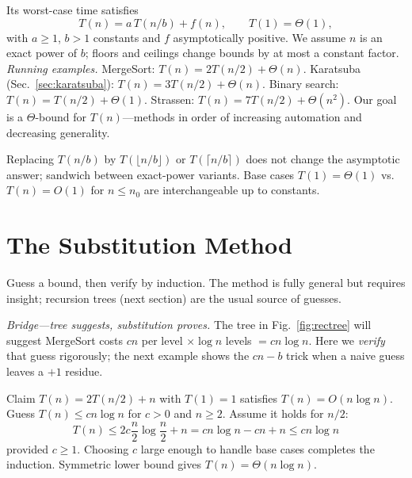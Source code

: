 Its worst-case time satisfies
\begin{equation}\label{eq:general}
T(n)=a\,T(n/b)+f(n),\qquad T(1)=\Theta(1),
\end{equation}
with $a\ge 1$, $b>1$ constants and $f$ asymptotically positive. We assume $n$ is an exact power of $b$; floors and ceilings change bounds by at most a constant factor.
\textit{Running examples.} MergeSort: $T(n)=2T(n/2)+\Theta(n)$. Karatsuba (Sec.~\ref{sec:karatsuba}): $T(n)=3T(n/2)+\Theta(n)$. Binary search: $T(n)=T(n/2)+\Theta(1)$. Strassen: $T(n)=7T(n/2)+\Theta(n^{2})$.
Our goal is a $\Theta$-bound for $T(n)$---methods in order of increasing automation and decreasing generality.
\begin{remark}
Replacing $T(n/b)$ by $T(\lfloor n/b\rfloor)$ or $T(\lceil n/b\rceil)$ does not change the asymptotic answer; sandwich between exact-power variants. Base cases $T(1)=\Theta(1)$ vs.\ $T(n)=O(1)$ for $n\le n_{0}$ are interchangeable up to constants.
\end{remark}

\section{The Substitution Method}

Guess a bound, then verify by induction. The method is fully general but requires insight; recursion trees (next section) are the usual source of guesses.

\smallskip\noindent\textit{Bridge---tree suggests, substitution proves.} The tree in Fig.~\ref{fig:rectree} will suggest MergeSort costs $cn$ per level $\times\log n$ levels $=cn\log n$. Here we \emph{verify} that guess rigorously; the next example shows the $cn-b$ trick when a naive guess leaves a $+1$ residue.

\begin{example}
Claim $T(n)=2T(n/2)+n$ with $T(1)=1$ satisfies $T(n)=O(n\log n)$. Guess $T(n)\le cn\log n$ for $c>0$ and $n\ge 2$. Assume it holds for $n/2$:
\[T(n)\le 2c\frac{n}{2}\log\frac{n}{2}+n = cn\log n-cn+n\le cn\log n\]
provided $c\ge 1$. Choosing $c$ large enough to handle base cases completes the induction. Symmetric lower bound gives $T(n)=\Theta(n\log n)$.
\end{example}

